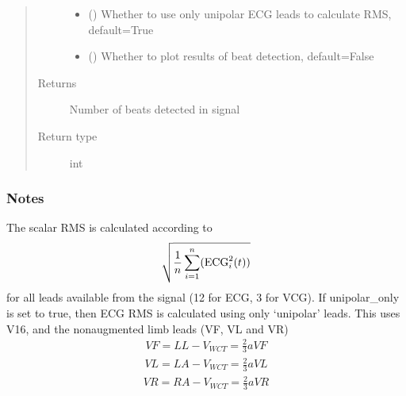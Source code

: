 \documentclass[letterpaper,10pt,english]{sphinxmanual}
\begin{document}
\begin{fulllineitems}
\begin{fulllineitems}
\begin{quote}
\begin{description}
\begin{itemize}
\item {} 
\sphinxAtStartPar
{} (\sphinxstyleliteralemphasis{\sphinxupquote{, }}) \textendash{} Whether to use only unipolar ECG leads to calculate RMS, default=True

\item {} 
\sphinxAtStartPar
{} () \textendash{} Whether to plot results of beat detection, default=False

\end{itemize}

\item[{Returns}] \leavevmode
\sphinxAtStartPar
{} \textendash{} Number of beats detected in signal

\item[{Return type}] \leavevmode
\sphinxAtStartPar
int

\end{description}\end{quote}
\subsubsection*{Notes}

\sphinxAtStartPar
The scalar RMS is calculated according to
\begin{equation*}
\begin{split}\sqrt{ \frac{1}{n}\sum_{i=1}^n (\textnormal{ECG}_i^2(t)) }\end{split}
\end{equation*}
\sphinxAtStartPar
for all leads available from the signal (12 for ECG, 3 for VCG). If unipolar\_only is set to true, then ECG RMS
is calculated using only ‘unipolar’ leads. This uses V1\sphinxhyphen{}6, and the non\sphinxhyphen{}augmented limb leads (VF, VL and VR)
\begin{equation*}
\begin{split}VF = LL-V_{WCT} = \frac{2}{3}aVF\end{split}
\end{equation*}\begin{equation*}
\begin{split}VL = LA-V_{WCT} = \frac{2}{3}aVL\end{split}
\end{equation*}\begin{equation*}
\begin{split}VR = RA-V_{WCT} = \frac{2}{3}aVR\end{split}
\end{equation*}
\end{fulllineitems}


\end{fulllineitems}
\end{document}
